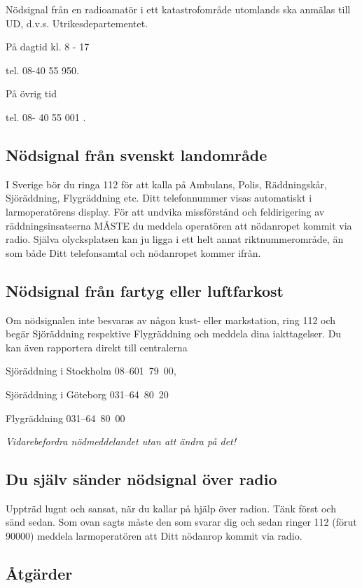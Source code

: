 Nödsignal från en radioamatör i ett katastrofområde utomlands ska anmälas till UD, d.v.s.
Utrikesdepartementet.

På dagtid kl. 8 - 17

tel. 08-40 55 950.

På övrig tid

tel. 08- 40 55 001 .


\subsection{Nödsignal från svenskt landområde}

I Sverige bör du ringa 112 för att kalla på Ambulans, Polis,
Räddningskår, Sjöräddning, Flygräddning etc. Ditt telefonnummer visas
automatiskt i larmoperatörens display.  För att undvika missförstånd och
feldirigering av räddningsinsatserna MÅSTE du meddela operatören att nödanropet
kommit via radio. Själva olycksplatsen kan ju ligga i ett helt annat
riktnummerområde, än som både Ditt telefonsamtal och nödanropet kommer ifrån.

\subsection{Nödsignal från fartyg eller luftfarkost}

Om nödsignalen inte besvaras av någon kust- eller markstation, ring 112
och begär Sjöräddning respektive Flygräddning och meddela dina
iakttagelser. Du kan även rapportera direkt till centralerna

Sjöräddning i Stockholm 08--601~79~00,

Sjöräddning i Göteborg 031--64~80~20

Flygräddning 031--64~80~00

\emph{Vidarebefordra nödmeddelandet utan att ändra på det!}

\subsection{Du själv sänder nödsignal över radio}

Uppträd lugnt och sansat, när du kallar på hjälp över radion. Tänk först och
sänd sedan. Som ovan sagts måste den som svarar dig och sedan ringer 112 (förut
90000) meddela larmoperatören att Ditt nödanrop kommit via radio.

\subsection{Åtgärder}

